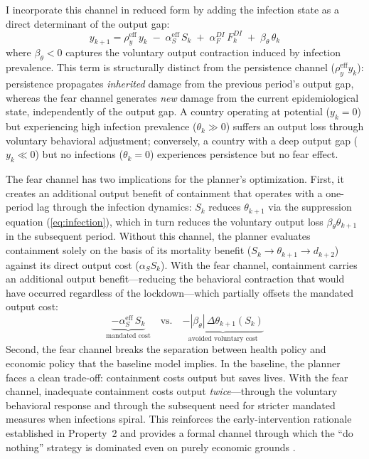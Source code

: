 \documentclass[12pt, a4paper]{article}
\begin{document}
I incorporate this channel in reduced form by adding the infection state as a direct determinant of the output gap:
%
\begin{equation}
    y_{k+1} = \rho_y^{\text{eff}} \, y_k
      \;-\; \alpha_S^{\text{eff}} \, S_k
      \;+\; \alpha_F^{DI} \, F_k^{DI}
      \;+\; \beta_\theta \, \theta_k
    \label{eq:output_fear}
\end{equation}
%
where $\beta_\theta < 0$ captures the voluntary output contraction induced by infection prevalence. This term is structurally distinct from the persistence channel ($\rho_y^{\text{eff}} y_k$): persistence propagates \textit{inherited} damage from the previous period's output gap, whereas the fear channel generates \textit{new} damage from the current epidemiological state, independently of the output gap. A country operating at potential ($y_k = 0$) but experiencing high infection prevalence ($\theta_k \gg 0$) suffers an output loss through voluntary behavioral adjustment; conversely, a country with a deep output gap ($y_k \ll 0$) but no infections ($\theta_k = 0$) experiences persistence but no fear effect.

The fear channel has two implications for the planner's optimization. First, it creates an additional output benefit of containment that operates with a one-period lag through the infection dynamics: $S_k$ reduces $\theta_{k+1}$ via the suppression equation (\ref{eq:infection}), which in turn reduces the voluntary output loss $\beta_\theta \theta_{k+1}$ in the subsequent period. Without this channel, the planner evaluates containment solely on the basis of its mortality benefit ($S_k \to \theta_{k+1} \to d_{k+2}$) against its direct output cost ($\alpha_S S_k$). With the fear channel, containment carries an additional output benefit---reducing the behavioral contraction that would have occurred regardless of the lockdown---which partially offsets the mandated output cost:
%
\begin{equation}
    \underbrace{-\alpha_S^{\text{eff}} \, S_k}_{\text{mandated cost}} \quad \text{vs.} \quad \underbrace{-|\beta_\theta| \, \Delta\theta_{k+1}(S_k)}_{\text{avoided voluntary cost}}
    \label{eq:fear_tradeoff}
\end{equation}
%
Second, the fear channel breaks the separation between health policy and economic policy that the baseline model implies. In the baseline, the planner faces a clean trade-off: containment costs output but saves lives. With the fear channel, inadequate containment costs output \textit{twice}---through the voluntary behavioral response and through the subsequent need for stricter mandated measures when infections spiral. This reinforces the early-intervention rationale established in Property~2 and provides a formal channel through which the ``do nothing'' strategy is dominated even on purely economic grounds \citep{correia2022}.
\end{document}
